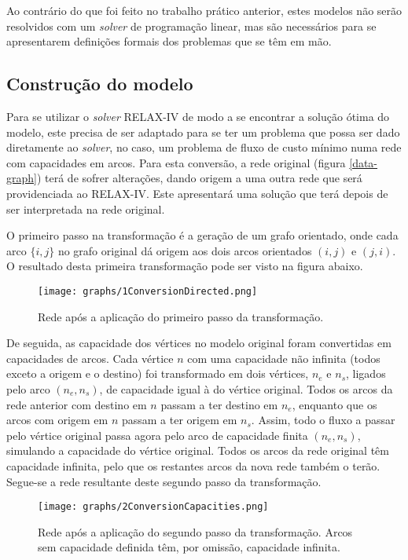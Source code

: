 \documentclass[12pt, a4paper, titlepage]{article}
\begin{document}
Ao contrário do que foi feito no trabalho prático anterior, estes modelos não serão resolvidos com
um \emph{solver} de programação linear, mas são necessários para se apresentarem definições formais
dos problemas que se têm em mão.

\subsection{Construção do modelo}

Para se utilizar o \emph{solver} RELAX-IV \cite{relax} de modo a se encontrar a solução ótima do
modelo, este precisa de ser adaptado para se ter um problema que possa ser dado diretamente ao
\emph{solver}, no caso, um problema de fluxo de custo mínimo numa rede com capacidades em arcos.
Para esta conversão, a rede original (figura \ref{data-graph}) terá de sofrer alterações, dando
origem a uma outra rede que será providenciada ao RELAX-IV. Este apresentará uma solução que terá
depois de ser interpretada na rede original.

O primeiro passo na transformação é a geração de um grafo orientado, onde cada arco $\{i, j\}$ no
grafo original dá origem aos dois arcos orientados $(i, j)$ e $(j, i)$. O resultado desta primeira
transformação pode ser visto na figura abaixo.

\begin{figure}[H]
    \centering
    \texttt{[image: graphs/1ConversionDirected.png]}
    \caption{Rede após a aplicação do primeiro passo da transformação.}
    \label{1conversion-graph}
\end{figure}

De seguida, as capacidade dos vértices no modelo original foram convertidas em capacidades de arcos.
Cada vértice $n$ com uma capacidade não infinita (todos exceto a origem e o destino) foi
transformado em dois vértices, $n_e$ e $n_s$, ligados pelo arco $(n_e, n_s)$, de capacidade igual à
do vértice original. Todos os arcos da rede anterior com destino em $n$ passam a ter destino em
$n_e$, enquanto que os arcos com origem em $n$ passam a ter origem em $n_s$. Assim, todo o fluxo a
passar pelo vértice original passa agora pelo arco de capacidade finita $(n_e, n_s)$, simulando a
capacidade do vértice original. Todos os arcos da rede original têm capacidade infinita, pelo que
os restantes arcos da nova rede também o terão. Segue-se a rede resultante deste segundo passo da
transformação.

\begin{figure}[H]
    \centering
    \texttt{[image: graphs/2ConversionCapacities.png]}
    \caption{\onehalfspacing
        Rede após a aplicação do segundo passo da transformação. Arcos sem capacidade definida têm,
        por omissão, capacidade infinita.}
    \label{2conversion-graph}
\end{figure}
\end{document}
